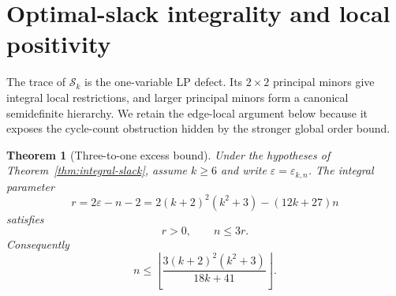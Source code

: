\documentclass[a4paper,10pt,reqno]{amsart}
\theoremstyle{plain}
\newtheorem{theorem}{Theorem}[section]
\theoremstyle{definition}
\theoremstyle{remark}
\newcommand{\resultbox}[1]{\boxed{#1}}
\begin{document}
\section{Optimal-slack integrality and local positivity}
\label{sec:degree-six}

The trace of \(\mathcal S_k\) is the one-variable LP defect.  Its
\(2\times2\) principal minors give integral local restrictions, and larger
principal minors form a canonical semidefinite hierarchy.  We retain the
edge-local argument below because it exposes the cycle-count obstruction
hidden by the stronger global order bound.

\begin{theorem}[Three-to-one excess bound]\label{thm:three-to-one}
Under the hypotheses of Theorem~\ref{thm:integral-slack}, assume \(k\ge6\)
and write \(\varepsilon=\varepsilon_{k,n}\).  The integral parameter
\[
 r=2\varepsilon-n-2
   =2(k+2)^2(k^2+3)-(12k+27)n
\]
satisfies
\[
 r>0,\qquad n\le3r.
\]
Consequently
\[
 \resultbox{
 n\le\left\lfloor
 \frac{3(k+2)^2(k^2+3)}{18k+41}
 \right\rfloor.
 }
\]
\end{theorem}
\end{document}

